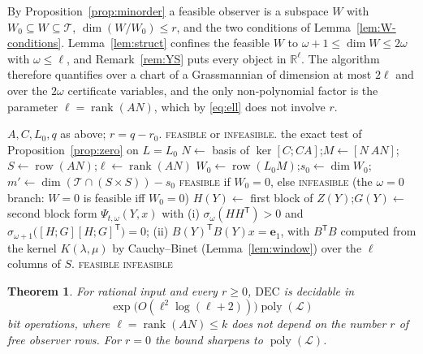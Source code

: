 \documentclass[journal]{IEEEtran}
\theoremstyle{plainn}
\newtheorem{thm}{Theorem}
\theoremstyle{remark}
\begin{document}
By Proposition~\ref{prop:minorder} a feasible observer is a subspace $W$ with
$W_0\subseteq W\subseteq\mathcal T$, $\dim(W/W_0)\le r$, and the two conditions of
Lemma~\ref{lem:W-conditions}. Lemma~\ref{lem:struct} confines the feasible $W$ to
$\omega+1\le\dim W\le2\omega$ with $\omega\le\ell$, and Remark~\ref{rem:YS} puts every object in
$\mathbb R^\ell$. The algorithm therefore quantifies over a chart of a Grassmannian of dimension
at most $2\ell$ and over the $2\omega$ certificate variables, and the only non-polynomial factor
is the parameter $\ell=\operatorname{rank}(AN)$, which by \eqref{eq:ell} does not involve $r$.

\begin{algorithm}[!t]
\caption{Deciding $\mathrm{DEC}(q)$ in time $f(\ell)\operatorname{poly}(\mathcal L)$}
\label{alg:fpt}
\begin{algorithmic}[1]
\Require $A,C,L_0,q$ as above; $r=q-r_0$.
\Ensure \textsc{feasible} or \textsc{infeasible}.
  \State \Return the exact test of Proposition~\ref{prop:zero} on $L=L_0$
\EndIf
\State $N\gets$ basis of $\ker[C;CA]$;\quad $M\gets[N\ AN]$;\quad
$S\gets\operatorname{row}(AN)$;\quad $\ell\gets\operatorname{rank}(AN)$
\State $W_0\gets\operatorname{row}(L_0M)$;\quad $s_0\gets\dim W_0$;\quad
$m'\gets\dim(\mathcal T\cap(S\times S))-s_0$
  \State \Return \textsc{feasible} if $W_0=0$, else \textsc{infeasible}
  \Statex \quad \textup{(the $\omega=0$ branch: $W=0$ is feasible iff $W_0=0$)}
\EndIf
{}
    \State $H(Y)\gets$ first block of $Z(Y)$;\quad $G(Y)\gets$ second block
      \State form $\Psi_{t,\omega}(Y,x)$ with
      \Statex \quad (i) $\sigma_\omega(HH^{\mathsf T})>0$ and
               $\sigma_{\omega+1}\bigl([H;G][H;G]^{\mathsf T}\bigr)=0$;
      \Statex \quad (ii) $B(Y)^{\mathsf T}B(Y)x=\mathbf e_1$, with $B^{\mathsf T}B$ computed
               from the kernel $K(\lambda,\mu)$ by Cauchy--Binet (Lemma~\ref{lem:window}) over the
               $\ell$ columns of $S$.
        \State \Return \textsc{feasible}
      \EndIf
    \EndFor
  \EndFor
\EndFor
\State \Return \textsc{infeasible}
\end{algorithmic}
\end{algorithm}

\begin{thm}\label{thm:fpt}
For rational input and every $r\ge0$, $\mathrm{DEC}$ is decidable in
\begin{equation}\label{eq:fpt-l}
\exp\bigl(O(\ell^2\log(\ell+2))\bigr)\operatorname{poly}(\mathcal L)
\end{equation}
bit operations, where $\ell=\operatorname{rank}(AN)\le k$ does not depend on the number $r$ of
free observer rows. For $r=0$ the bound sharpens to $\operatorname{poly}(\mathcal L)$.
\end{thm}
\end{document}
